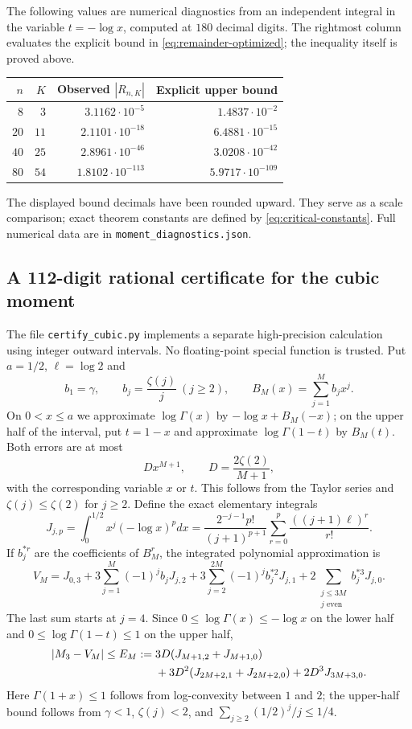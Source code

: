 The following values are numerical diagnostics from an independent integral
in the variable $t=-\log x$, computed at $180$ decimal digits.  The
rightmost column evaluates the explicit bound in
\eqref{eq:remainder-optimized}; the inequality itself is proved above.
\begin{center}
\begin{tabular}{rrrr}
\hline
$n$ & $K$ & Observed $|R_{n,K}|$ & Explicit upper bound \\
\hline
$8$ & $3$ & $3.1162\cdot10^{-5}$ & $1.4837\cdot10^{-2}$ \\
$20$ & $11$ & $2.1101\cdot10^{-18}$ & $6.4881\cdot10^{-15}$ \\
$40$ & $25$ & $2.8961\cdot10^{-46}$ & $3.0208\cdot10^{-42}$ \\
$80$ & $54$ & $1.8102\cdot10^{-113}$ & $5.9717\cdot10^{-109}$ \\
\hline
\end{tabular}
\end{center}
The displayed bound decimals have been rounded upward.  They serve as a
scale comparison; exact theorem constants are defined by
\eqref{eq:critical-constants}.  Full numerical data are in
\texttt{moment\_diagnostics.json}.

\subsection{A 112-digit rational certificate for the cubic moment}
The file \texttt{certify\_cubic.py} implements a separate high-precision
calculation using integer outward intervals.  No floating-point special
function is trusted.  Put $a=1/2$, $\ell=\log2$ and
\[
 b_1=\gamma,\qquad b_j=\frac{\zeta(j)}j\ (j\ge2),\qquad
 B_M(x)=\sum_{j=1}^{M}b_jx^j.
\]
On $0<x\le a$ we approximate
$\log\Gamma(x)$ by $-\log x+B_M(-x)$; on the upper half of the interval,
put $t=1-x$ and approximate $\log\Gamma(1-t)$ by $B_M(t)$.
Both errors are at most
\[
 D x^{M+1},\qquad D=\frac{2\zeta(2)}{M+1},
\]
with the corresponding variable $x$ or $t$.  This follows from the Taylor
series and $\zeta(j)\le\zeta(2)$ for $j\ge2$.
Define the exact elementary integrals
\[
 J_{j,p}=\int_0^{1/2}x^j(-\log x)^p dx
 =\frac{2^{-j-1}p!}{(j+1)^{p+1}}
 \sum_{r=0}^{p}\frac{((j+1)\ell)^r}{r!}.
\]
If $b^{*r}_j$ are the coefficients of $B_M^r$, the integrated polynomial
approximation is
\[
 V_M=J_{0,3}+3\sum_{j=1}^{M}(-1)^jb_jJ_{j,2}
 +3\sum_{j=2}^{2M}(-1)^jb^{*2}_jJ_{j,1}
 +2\sum_{\substack{j\le3M\\j\text{ even}}}b^{*3}_jJ_{j,0}.
\]
The last sum starts at $j=4$.  Since $0\le\log\Gamma(x)\le-\log x$
on the lower half and $0\le\log\Gamma(1-t)\le1$ on the upper half,
\begin{align}
 |M_3-V_M|\le E_M:={}&3D(J_{M+1,2}+J_{M+1,0})\notag\\
 &+3D^2(J_{2M+2,1}+J_{2M+2,0})+2D^3J_{3M+3,0}.
 \label{eq:cubic-certified-error}
\end{align}
Here $\Gamma(1+x)\le1$ follows from log-convexity between $1$ and $2$;
the upper-half bound follows from $\gamma<1$, $\zeta(j)<2$, and
$\sum_{j\ge2}(1/2)^j/j\le1/4$.


